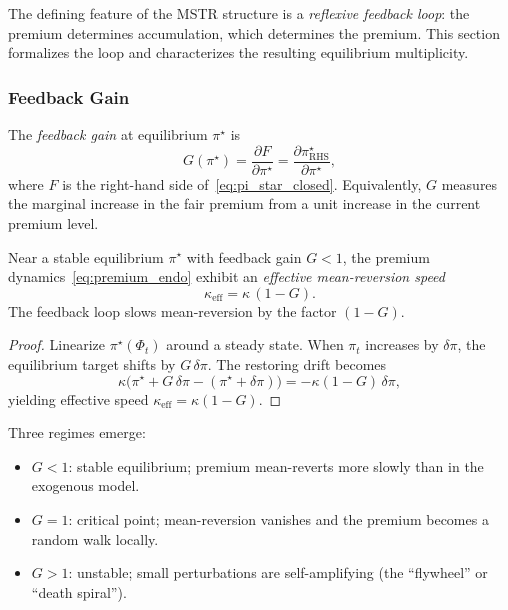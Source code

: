 The defining feature of the MSTR structure is a \emph{reflexive feedback loop}:
the premium determines accumulation, which determines the premium.  This
section formalizes the loop and characterizes the resulting equilibrium
multiplicity.

\subsubsection{Feedback Gain}
\label{sec:feedback_gain}

\begin{definition}
  \label{def:feedback_gain}
  The \emph{feedback gain} at equilibrium $\pi^\star$ is
  \begin{equation}
    \label{eq:feedback_gain}
    G(\pi^\star)
    = \frac{\partial F}{\partial \pi^\star}
    = \frac{\partial \pi^\star_{\mathrm{RHS}}}{\partial \pi^\star},
  \end{equation}
  where $F$ is the right-hand side of~\eqref{eq:pi_star_closed}.
  Equivalently, $G$ measures the marginal increase in the fair premium from a
  unit increase in the current premium level.
\end{definition}

\begin{proposition}
  \label{prop:effective_kappa}
  Near a stable equilibrium $\pi^\star$ with feedback gain $G < 1$, the
  premium dynamics~\eqref{eq:premium_endo} exhibit an \emph{effective
  mean-reversion speed}
  \begin{equation}
    \label{eq:kappa_eff}
    \boxed{
      \kappa_{\mathrm{eff}} = \kappa\,(1 - G).
    }
  \end{equation}
  The feedback loop slows mean-reversion by the factor $(1-G)$.
\end{proposition}

\begin{proof}
  Linearize $\pi^\star(\Phi_t)$ around a steady state.  When $\pi_t$ increases
  by $\delta\pi$, the equilibrium target shifts by $G\,\delta\pi$.  The
  restoring drift becomes
  \[
    \kappa\bigl(\pi^\star + G\,\delta\pi - (\pi^\star + \delta\pi)\bigr)
    = -\kappa(1 - G)\,\delta\pi,
  \]
  yielding effective speed $\kappa_{\mathrm{eff}} = \kappa(1-G)$.
\end{proof}

\begin{remark}
  Three regimes emerge:
  \begin{itemize}
    \item $G < 1$: stable equilibrium; premium mean-reverts more slowly than
          in the exogenous model.
    \item $G = 1$: critical point; mean-reversion vanishes and the premium
          becomes a random walk locally.
    \item $G > 1$: unstable; small perturbations are self-amplifying (the
          ``flywheel'' or ``death spiral'').
  \end{itemize}
\end{remark}

